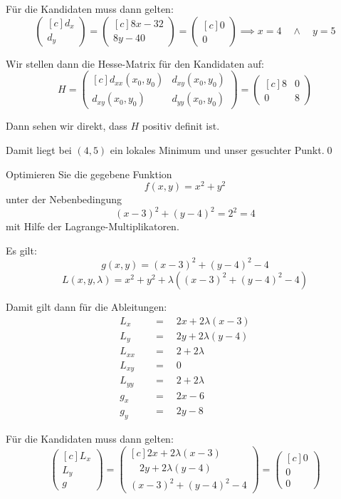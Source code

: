 \documentclass[answers]{exam}
\newcommand{\vektor}[1]{\begin{pmatrix*}[c] #1 \end{pmatrix*}}
\begin{document}
\begin{questions}
\begin{solution}
        Für die Kandidaten muss dann gelten:
        $$
            \vektor{d_x \\ d_y} = \vektor{8x - 32 \\ 8y - 40} = \vektor{0\\0} \implies x = 4 \quad \land \quad y = 5
        $$

        Wir stellen dann die Hesse-Matrix für den Kandidaten auf:
        $$
            H = \vektor{d_{xx}(x_0, y_0) & d_{xy}(x_0, y_0) \\ d_{xy}(x_0, y_0) & d_{yy}(x_0, y_0)} = \vektor{8 & 0 \\ 0 & 8}
        $$

        Dann sehen wir direkt, dass $H$ positiv definit ist.

        Damit liegt bei $(4, 5)$ ein lokales Minimum und unser gesuchter Punkt.\qed
    \end{solution}

    \newpage
    \question
    Optimieren Sie die gegebene Funktion
    $$
        f(x, y) = x^2 + y^2
    $$
    unter der Nebenbedingung
    $$
        (x-3)^2 + (y-4)^2 = 2^2 = 4
    $$
    mit Hilfe der Lagrange-Multiplikatoren.
    \begin{solution}
        Es gilt:
        $$
            g(x, y) = (x-3)^2 + (y-4)^2 - 4
        $$
        $$
            L(x, y, \lambda) = x^2 + y^2 + \lambda \left( (x-3)^2 + (y-4)^2 -4 \right)
        $$

        Damit gilt dann für die Ableitungen:
        $$
            \begin{aligned}
                L_x \quad    & = \quad 2x + 2\lambda(x-3) \\
                L_y \quad    & = \quad 2y + 2\lambda(y-4) \\
                L_{xx} \quad & = \quad 2 + 2\lambda       \\
                L_{xy} \quad & = \quad 0                  \\
                L_{yy} \quad & = \quad 2 + 2\lambda       \\
                g_x \quad    & = \quad 2x-6               \\
                g_y \quad    & = \quad 2y - 8
            \end{aligned}
        $$

        Für die Kandidaten muss dann gelten:
        $$
            \vektor{L_x \\ L_y \\ g} = \vektor{2x + 2\lambda(x-3) \\ \quad 2y + 2\lambda(y-4) \\ (x-3)^2 + (y-4)^2 - 4} = \vektor{0\\0\\0}
        $$


\end{solution}
\end{questions}
\end{document}
